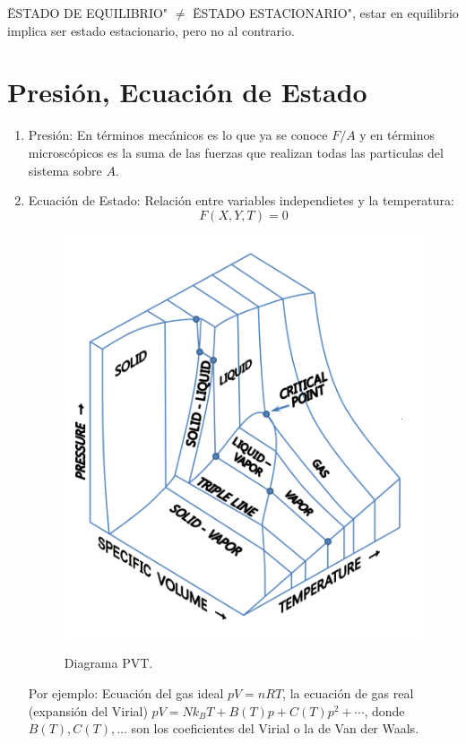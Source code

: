 \" ESTADO DE EQUILIBRIO" $\neq$ \" ESTADO ESTACIONARIO", estar en equilibrio implica ser estado estacionario, pero no al contrario.


\section{Presión, Ecuación de Estado}
\begin{enumerate}
	\item Presión: En términos mecánicos es lo que ya se conoce $F/A$ y en términos microscópicos es la suma de las fuerzas que realizan todas las particulas del sistema sobre $A$.
	\item Ecuación de Estado: Relación entre variables independietes y la temperatura:
		$$ F (X,Y,T) = 0 $$
	\begin{figure}[H]
		\centering
		\includegraphics[scale=0.2]{./img/PVT_diagram.png}
		\label{PVT}
		\caption{Diagrama PVT.}
	\end{figure}
	Por ejemplo: Ecuación del gas ideal $pV = nRT$, la ecuación de gas real (expansión del Virial) $pV = Nk_B T + B(T) p + C(T) p^2 + \cdots$, donde $B(T), C(T), \ldots$ son los coeficientes del Virial o la de Van der Waals.

\end{enumerate}
